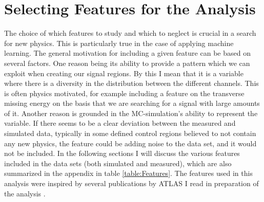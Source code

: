 \section{Selecting Features for the Analysis}\label{sec:Feats}
The choice of which features to study and which to neglect is crucial in a search for new physics. This is particularly true 
in the case of applying machine learning. The general motivation for including a given feature can be based on several factors. 
One reason being its ability to provide a pattern which we can exploit when creating our signal regions. By this I mean
that it is a variable where there is a diversity in the distribution between the different channels. This is often physics motivated, for example 
including a feature on the transverse missing energy on the basis that we are searching for a signal with large amounts of it. 
Another reason is grounded in the \ac{MC}-simulation's ability to represent the variable. If there seems to be a clear deviation between the 
measured and simulated data, typically in some defined control regions believed to not contain any new physics, the feature could be adding noise 
to the data set, and it would not be included. In the following sections I will discuss the various features included in the data sets (both simulated and measured), 
which are also summarized in the appendix in table \ref{table:Features}. The features used in this analysis were inspired by several publications by \ac{ATLAS} I read in 
preparation of the analysis \cite{franchini_search_2019, atlas_search_2021}.